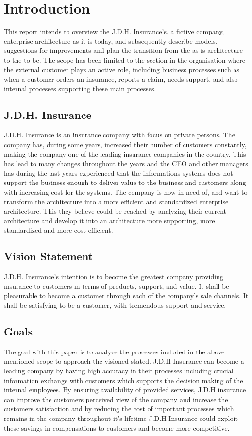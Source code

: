 \section{Introduction}
\label{sec:introduction}
This report intends to overview the J.D.H. Insurance's, a fictive company, enterprise architecture as it is today, and subsequently describe models, suggestions for improvements and plan the transition from the as-is architecture to the to-be. The scope has been limited to the section in the organisation where the external customer plays an active role, including business processes such as when a customer orders an insurance, reports a claim, needs support, and also internal processes supporting these main processes.
\subsection{J.D.H. Insurance}
\label{sec:j_d_h_insurance}
J.D.H. Insurance is an insurance company with focus on private persons. The company has, during some years, increased their number of customers constantly, making the company one of the leading insurance companies in the country. This has lead to many changes throughout the years and the CEO and other managers has during the last years experienced that the informations systems does not support the business enough to deliver value to the business and customers along with increasing cost for the systems. The company is now in need of, and want to transform the architecture into a more efficient and standardized enterprise architecture. This they believe could be reached by analyzing their current architecture and develop it into an architecture more supporting, more standardized and more cost-efficient.
\subsection{Vision Statement}
\label{sec:vision_statement}
J.D.H. Insurance's intention is to become the greatest company providing insurance to customers in terms of products, support, and value. It shall be pleasurable to become a customer through each of the company's sale channels. It shall be satisfying to be a customer, with tremendous support and service.
\subsection{Goals}
\label{sec:goals}
The goal with this paper is to analyze the processes included in the above mentioned scope to approach the visioned stated. J.D.H Insurance can become a leading company by having high accuracy in their processes including crucial information exchange with customers which supports the decision making of the internal employees. By ensuring availability of provided services, J.D.H insurance can improve the customers perceived view of the company and increase the customers satisfaction and by reducing the cost of important processes which remains in the company throughout it's lifetime J.D.H Insurance could exploit these savings in compensations to customers and become more competitive.
